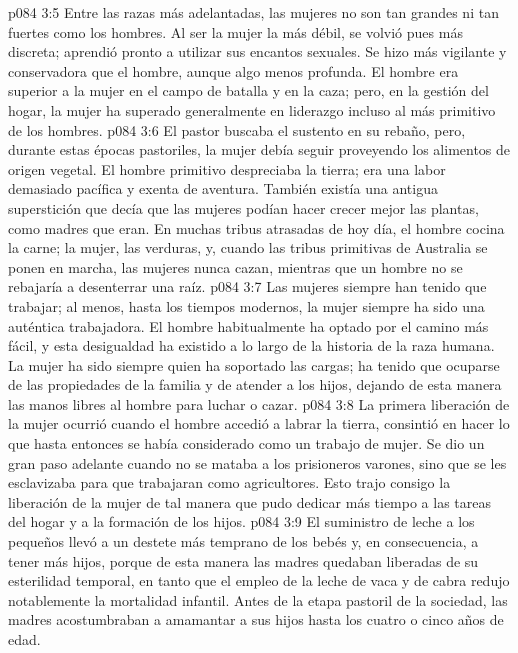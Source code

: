 \vs p084 3:5 Entre las razas más adelantadas, las mujeres no son tan grandes ni tan fuertes como los hombres. Al ser la mujer la más débil, se volvió pues más discreta; aprendió pronto a utilizar sus encantos sexuales. Se hizo más vigilante y conservadora que el hombre, aunque algo menos profunda. El hombre era superior a la mujer en el campo de batalla y en la caza; pero, en la gestión del hogar, la mujer ha superado generalmente en liderazgo incluso al más primitivo de los hombres.
\vs p084 3:6 \pc El pastor buscaba el sustento en su rebaño, pero, durante estas épocas pastoriles, la mujer debía seguir proveyendo los alimentos de origen vegetal. El hombre primitivo despreciaba la tierra; era una labor demasiado pacífica y exenta de aventura. También existía una antigua superstición que decía que las mujeres podían hacer crecer mejor las plantas, como madres que eran. En muchas tribus atrasadas de hoy día, el hombre cocina la carne; la mujer, las verduras, y, cuando las tribus primitivas de Australia se ponen en marcha, las mujeres nunca cazan, mientras que un hombre no se rebajaría a desenterrar una raíz.
\vs p084 3:7 Las mujeres siempre han tenido que trabajar; al menos, hasta los tiempos modernos, la mujer siempre ha sido una auténtica trabajadora. El hombre habitualmente ha optado por el camino más fácil, y esta desigualdad ha existido a lo largo de la historia de la raza humana. La mujer ha sido siempre quien ha soportado las cargas; ha tenido que ocuparse de las propiedades de la familia y de atender a los hijos, dejando de esta manera las manos libres al hombre para luchar o cazar.
\vs p084 3:8 La primera liberación de la mujer ocurrió cuando el hombre accedió a labrar la tierra, consintió en hacer lo que hasta entonces se había considerado como un trabajo de mujer. Se dio un gran paso adelante cuando no se mataba a los prisioneros varones, sino que se les esclavizaba para que trabajaran como agricultores. Esto trajo consigo la liberación de la mujer de tal manera que pudo dedicar más tiempo a las tareas del hogar y a la formación de los hijos.
\vs p084 3:9 El suministro de leche a los pequeños llevó a un destete más temprano de los bebés y, en consecuencia, a tener más hijos, porque de esta manera las madres quedaban liberadas de su esterilidad temporal, en tanto que el empleo de la leche de vaca y de cabra redujo notablemente la mortalidad infantil. Antes de la etapa pastoril de la sociedad, las madres acostumbraban a amamantar a sus hijos hasta los cuatro o cinco años de edad.
